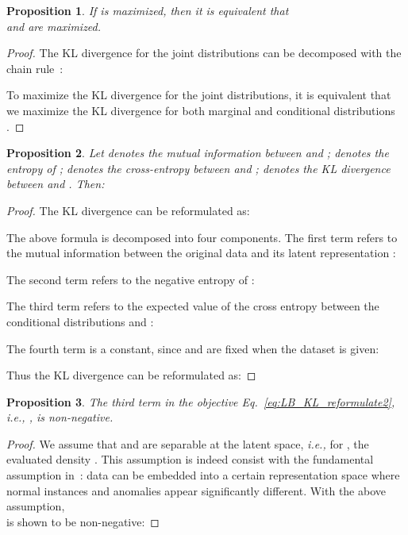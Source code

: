 \documentclass{bmvc2k}
\newtheorem{proposition}{Proposition}
\newtheorem{proof}{Proof}
\begin{document}
\begin{proposition}\label{rmk:eq}
If  is maximized, then it is equivalent that \\  and  are maximized.
\end{proposition}

\begin{proof}
The KL divergence for the joint distributions can be decomposed with the chain rule~\cite{cover2006elements}:

To maximize the KL divergence for the joint distributions, it is equivalent that we maximize the KL divergence for both marginal and conditional distributions \cite{dumoulin2016adversarially}.
\end{proof}

\begin{proposition}
Let  denotes the mutual information between  and ;  denotes the entropy of ;  denotes the cross-entropy between  and ;  denotes the KL divergence between  and . Then:

\end{proposition}

\begin{proof}
The KL divergence can be reformulated as:

The above formula is decomposed into four components. The first term refers to the mutual information between the original data  and its latent representation :

The second term refers to the negative entropy of :

The third term refers to the expected value of the cross entropy between the conditional distributions  and :

The fourth term is a constant, since  and  are fixed when the dataset is given:

Thus the KL divergence can be reformulated as:


\end{proof}

\begin{proposition}
The third term in the objective Eq.~\eqref{eq:LB_KL_reformulate2}, i.e., , is non-negative.
\end{proposition}
\begin{proof}
We assume that  and  are separable at the latent space, \emph{i.e.,} for , the evaluated density .
This assumption is indeed consist with the fundamental assumption in~\cite{chandola2009anomaly}: data can be embedded into a certain representation space where normal instances and anomalies appear significantly different.
With the above assumption,\\  is shown to be non-negative:

\end{proof}
\end{document}
